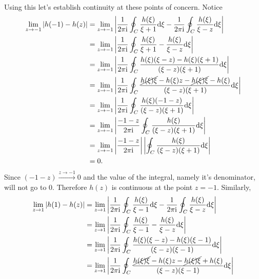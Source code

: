 \documentclass[10pt]{amsart}
\newcommand{\D}{\mathrm{d}}
\newcommand{\I}{\mathrm{i}}
\theoremstyle{nonumberplain}
\begin{document}
\begin{enumerate}[label={\bf {\arabic*}:}]
\begin{itemize}
\begin{align*}
\end{align*}
Using this let's establish continuity at these points of concern.
Notice
\begin{align*}
\lim_{z \rightarrow -1} \left| h(-1) - h(z) \right|
	&= \lim_{z \rightarrow -1} \left| \frac 1 {2\pi \I} \oint_C \frac {h(\xi)}{\xi + 1} \D \xi - \frac 1 {2\pi \I}\oint_C \frac {h(\xi)}{\xi - z} \D \xi \right| \\
	&= \lim_{z \rightarrow -1} \left| \frac 1 {2\pi \I} \oint_C \frac {h(\xi)}{\xi + 1} -  \frac {h(\xi)}{\xi - z} \D \xi \right| \\
	&= \lim_{z \rightarrow -1} \left| \frac 1 {2\pi \I} \oint_C \frac {h(\xi)(\xi - z) - h(\xi)(\xi + 1)}{(\xi - z)(\xi + 1)} \D \xi \right| \\
	&= \lim_{z \rightarrow -1} \left| \frac 1 {2\pi \I} \oint_C \frac {\cancel{h(\xi)\xi} - h(\xi)z - \cancel{h(\xi)\xi} - h(\xi)}{(\xi - z)(\xi + 1)} \D \xi \right| \\
	&= \lim_{z \rightarrow -1} \left| \frac 1 {2\pi \I} \oint_C \frac {h(\xi)(- 1 - z)}{(\xi - z)(\xi + 1)} \D \xi \right| \\
	&= \lim_{z \rightarrow -1} \left| \frac {-1 - z} {2\pi \I} \oint_C \frac {h(\xi)}{(\xi - z)(\xi + 1)} \D \xi \right| \\
	&= \lim_{z \rightarrow -1} \left| \frac {-1 - z} {2\pi \I} \right| \left|\oint_C \frac {h(\xi)}{(\xi - z)(\xi + 1)} \D \xi \right| \\
	&= 0.
\end{align*}
Since $(-1-z)\overset{z \to -1}{\longrightarrow} 0$ and the value of the integral, namely it's denominator, will not go to 0.
Therefore $h(z)$ is continuous at the point $z = -1$.
Similarly,
\begin{align*}
\lim_{z \rightarrow 1} \left| h(1) - h(z) \right|
	&= \lim_{z \rightarrow 1} \left| \frac 1 {2\pi \I} \oint_C \frac {h(\xi)}{\xi - 1} \D \xi - \frac 1 {2\pi \I}\oint_C \frac {h(\xi)}{\xi - z} \D \xi \right| \\
	&= \lim_{z \rightarrow 1} \left| \frac 1 {2\pi \I} \oint_C \frac {h(\xi)}{\xi - 1} -  \frac {h(\xi)}{\xi - z} \D \xi \right| \\
	&= \lim_{z \rightarrow 1} \left| \frac 1 {2\pi \I} \oint_C \frac {h(\xi)(\xi - z) - h(\xi)(\xi - 1)}{(\xi - z)(\xi - 1)} \D \xi \right| \\
	&= \lim_{z \rightarrow 1} \left| \frac 1 {2\pi \I} \oint_C \frac {\cancel{h(\xi)\xi} - h(\xi)z - \cancel{h(\xi)\xi} + h(\xi)}{(\xi - z)(\xi - 1)} \D \xi \right| \\

\end{align*}
\end{itemize}
\end{enumerate}
\end{document}
